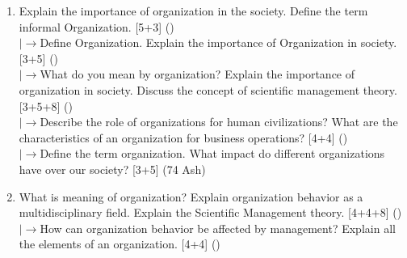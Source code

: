 \documentclass[12pt]{article}
\newcommand{\lb}{\\$\left|\rightarrow\right.$}
\begin{document}
\begin{enumerate}[topsep=0pt, noitemsep]
      \item Explain the importance of organization in the society. Define the term informal Organization. \hfill [5+3] ()
        \lb Define Organization. Explain the importance of Organization in society. \hfill [3+5] ()
        \lb What do you mean by organization? Explain the importance of organization in society. Discuss the concept of scientific management theory. \hfill [3+5+8] ()
        \lb Describe the role of organizations for human civilizations? What are the characteristics of an organization for business operations? \hfill [4+4] ()
        \lb Define the term organization. What impact do different organizations have over our society? \hfill [3+5] (74 Ash)

      \item What is meaning of organization? Explain organization behavior as a multidisciplinary field. Explain the Scientific Management theory. \hfill [4+4+8] ()
        \lb How can organization behavior be affected by management? Explain all the elements of an organization. \hfill [4+4] ()
    \end{enumerate}
\end{document}
